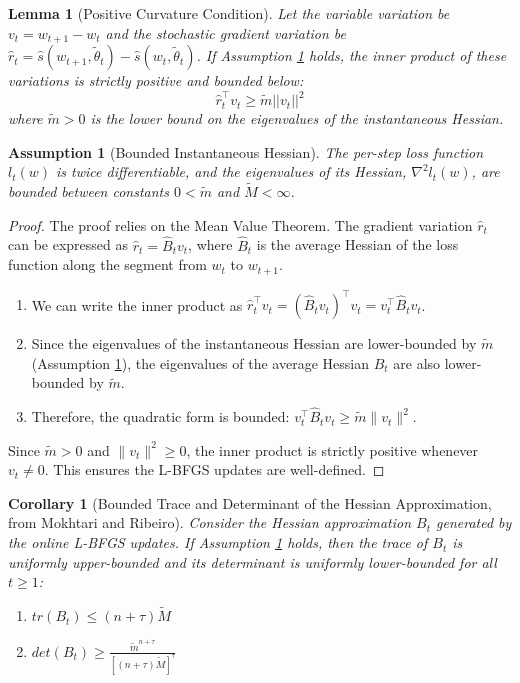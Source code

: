 \documentclass{article}
\theoremstyle{ssltheorem}
\newtheorem{lemma}{Lemma}
\newtheorem{assumption}{Assumption}
\newtheorem{corollary}{Corollary}
\begin{document}
\begin{lemma}[Positive Curvature Condition]
\label{lem:positive-curvature}
Let the variable variation be $v_{t} = w_{t+1} - w_{t}$ and the stochastic gradient variation be $\hat{r}_{t} = \hat{s}(w_{t+1}, \tilde{\theta}_{t}) - \hat{s}(w_{t}, \tilde{\theta}_{t})$.
If Assumption \ref{assum:bounded-hessian} holds, the inner product of these variations is strictly positive and bounded below:
$$
\hat{r}_{t}^{\top} v_{t} \ge \tilde{m} ||v_{t}||^{2}
$$
where $\tilde{m} > 0$ is the lower bound on the eigenvalues of the instantaneous Hessian.
\end{lemma}

\begin{assumption}[Bounded Instantaneous Hessian]
\label{assum:bounded-hessian}
The per-step loss function $l_{t}(w)$ is twice differentiable, and the eigenvalues of its Hessian, $\nabla^{2} l_{t}(w)$, are bounded between constants $0 < \tilde{m}$ and $\tilde{M} < \infty$.
\end{assumption}

\begin{proof}
The proof relies on the Mean Value Theorem. The gradient variation $\hat{r}_{t}$ can be expressed as $\hat{r}_{t} = \hat{B}_{t} v_{t}$, where $\hat{B}_{t}$ is the average Hessian of the loss function along the segment from $w_{t}$ to $w_{t+1}$.
\begin{enumerate}
    \item We can write the inner product as $\hat{r}_{t}^{\top} v_{t} = ( \hat{B}_{t} v_{t})^{\top} v_{t} = v_{t}^{\top} \hat{B}_{t} v_{t}$.
\item Since the eigenvalues of the instantaneous Hessian are lower-bounded by $\tilde{m}$ (Assumption \ref{assum:bounded-hessian}), the eigenvalues of the average Hessian $B_{t}$ are also lower-bounded by $\tilde{m}$.
\item Therefore, the quadratic form is bounded: $v_{t}^{\top} \hat{B}_{t} v_{t} \ge \tilde{m} \|v_{t}\|^{2}$.
\end{enumerate}
Since $\tilde{m} > 0$ and $\|v_{t}\|^{2} \ge 0$, the inner product is strictly positive whenever $v_{t} \neq 0$.
This ensures the L-BFGS updates are well-defined.
\end{proof}

\begin{corollary}[Bounded Trace and Determinant of the Hessian Approximation, from Mokhtari and Ribeiro]
\label{cor:trace-det-bound}
Consider the Hessian approximation $B_{t}$ generated by the online L-BFGS updates.
If Assumption \ref{assum:bounded-hessian} holds, then the trace of $B_{t}$ is uniformly upper-bounded and its determinant is uniformly lower-bounded for all $t \ge 1$:
\begin{enumerate}
    \item $tr(B_{t}) \le (n+\tau)\tilde{M}$
    \item $det(B_{t}) \ge \frac{\tilde{m}^{n+\tau}}{[(n+\tau)\tilde{M}]^{\tau}}$
\end{enumerate}
\end{corollary}
\end{document}
